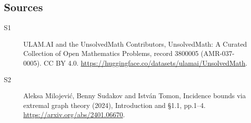 \documentclass[11pt]{article}
\begin{document}
\subsection{Sources}
\begin{description}
\item[\hypertarget{source:3800005:1}{S1}] ULAM.AI and the UnsolvedMath Contributors, UnsolvedMath: A Curated Collection of Open Mathematics Problems, record 3800005 (AMR-037-0005). CC BY 4.0. \url{https://huggingface.co/datasets/ulamai/UnsolvedMath}.
\item[\hypertarget{source:3800005:2}{S2}] Aleksa Milojević, Benny Sudakov and István Tomon, Incidence bounds via extremal graph theory (2024), Introduction and §1.1, pp.1–4. \url{https://arxiv.org/abs/2401.06670}.
\end{description}
\label{end:3800005}
\end{document}
